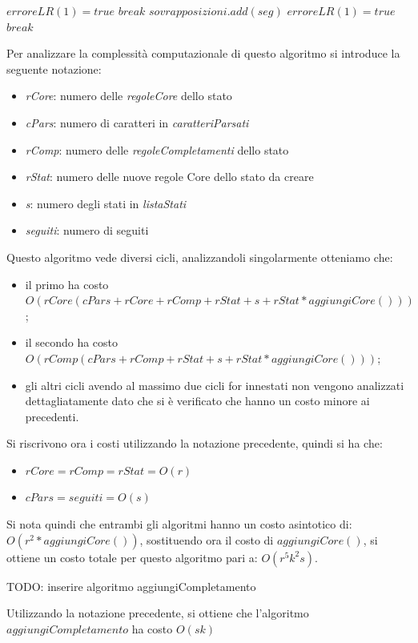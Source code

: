\documentclass[12pt]{article}
\newcounter{subsubsubsection}[subsubsection]
\begin{document}
\begin{algorithm}[H]
\begin{algorithmic}
\State $erroreLR(1) = true$
\State $break$
\Else
\State $sovrapposizioni.add(seg)$
\EndIf
\EndFor
\EndIf
\EndFor
{}
\State $erroreLR(1) = true$
\State $break$
\EndIf
\EndFor
\end{algorithmic}
\end{algorithm}
Per analizzare la complessità computazionale di questo algoritmo si introduce la seguente notazione:
\begin{itemize}
\item \textit{rCore}: numero delle \textit{regoleCore} dello stato
\item \textit{cPars}: numero di caratteri in \textit{caratteriParsati}
\item \textit{rComp}: numero delle \textit{regoleCompletamenti} dello stato
\item \textit{rStat}: numero delle nuove regole Core dello stato da creare
\item \textit{s}: numero degli stati in \textit{listaStati}
\item \textit{seguiti}: numero di seguiti
\end{itemize}
Questo algoritmo vede diversi cicli, analizzandoli singolarmente otteniamo che:
\begin{itemize}
\item il primo ha costo $O(rCore(cPars+rCore+rComp+rStat+s+rStat*aggiungiCore()))$;
\item il secondo ha costo $O(rComp(cPars + rComp+ rStat+ s + rStat*aggiungiCore()))$;
\item gli altri cicli avendo al massimo due cicli for innestati non vengono analizzati dettagliatamente dato che si è verificato che hanno un costo minore ai precedenti.
\end{itemize}
Si riscrivono ora i costi utilizzando la notazione precedente, quindi si ha che:
\begin{itemize}
\item $rCore = rComp = rStat = O(r)$
\item $cPars = seguiti = O(s)$
\end{itemize}
Si nota quindi che entrambi gli algoritmi hanno un costo asintotico di: $O(r^2*aggiungiCore())$, sostituendo ora il costo di $aggiungiCore()$, si ottiene un costo totale per questo algoritmo pari a: $O(r^5 k^2 s)$.
\par
\pagebreak
{}
TODO: inserire algoritmo aggiungiCompletamento\par
Utilizzando la notazione precedente, si ottiene che l'algoritmo $aggiungiCompletamento$ ha costo $O(sk)$
\par\pagebreak[4]
\end{document}
